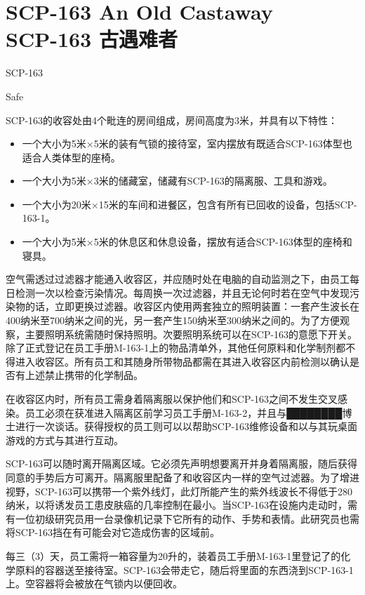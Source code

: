 \chapter[SCP-163 古遇难者]{
    SCP-163 An Old Castaway\\
    SCP-163 古遇难者
}

\label{chap:SCP-163}

SCP-163

Safe

SCP-163的收容处由4个毗连的房间组成，房间高度为3米，并具有以下特性：

\begin{itemize}
    \item 一个大小为5米×5米的装有气锁的接待室，室内摆放有既适合SCP-163体型也适合人类体型的座椅。
    \item 一个大小为5米×3米的储藏室，储藏有SCP-163的隔离服、工具和游戏。
    \item 一个大小为20米×15米的车间和进餐区，包含有所有已回收的设备，包括SCP-163-1。
    \item 一个大小为5米×5米的休息区和休息设备，摆放有适合SCP-163体型的座椅和寝具。
\end{itemize}

空气需透过过滤器才能通入收容区，并应随时处在电脑的自动监测之下，由员工每日检测一次以检查污染情况。每周换一次过滤器，并且无论何时若在空气中发现污染物的话，立即更换过滤器。收容区内使用两套独立的照明装置：一套产生波长在400纳米至700纳米之间的光，另一套产生150纳米至300纳米之间的。为了方便观察，主要照明系统需随时保持照明。次要照明系统可以在SCP-163的意愿下开关。除了正式登记在员工手册M-163-1上的物品清单外，其他任何原料和化学制剂都不得进入收容区。所有员工和其随身所带物品都需在其进入收容区内前检测以确认是否有上述禁止携带的化学制品。

在收容区内时，所有员工需身着隔离服以保护他们和SCP-163之间不发生交叉感染。员工必须在获准进入隔离区前学习员工手册M-163-2，并且与████████博士进行一次谈话。获得授权的员工则可以以帮助SCP-163维修设备和以与其玩桌面游戏的方式与其进行互动。

SCP-163可以随时离开隔离区域。它必须先声明想要离开并身着隔离服，随后获得同意的手势后方可离开。隔离服里配备了和收容区内一样的空气过滤器。为了增进视野，SCP-163可以携带一个紫外线灯，此灯所能产生的紫外线波长不得低于280纳米，以将诱发员工患皮肤癌的几率控制在最小。当SCP-163在设施内走动时，需有一位初级研究员用一台录像机记录下它所有的动作、手势和表情。此研究员也需将SCP-163挡在有可能会对它造成伤害的区域前。

每三（3）天，员工需将一箱容量为20升的，装着员工手册M-163-1里登记了的化学原料的容器送至接待室。SCP-163会带走它，随后将里面的东西浇到SCP-163-1上。空容器将会被放在气锁内以便回收。

